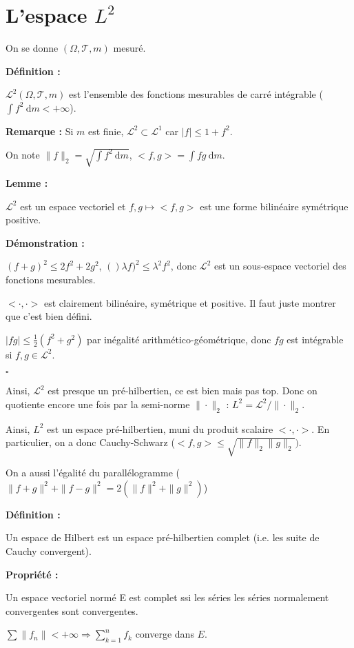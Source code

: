 \documentclass[10pt,a4paper,notitlepage ]{report}
\newcommand{\T}{\mathcal T}
\newcommand{\dd}{\ \mathrm d}
\newcommand{\1}{\mathds 1}
\newcommand{\LL}{\mathcal L}
\newenvironment{definition}[1][]{
	
	\textbf{Définition #1 : }
}
{}
\newcounter{th}
\newenvironment{propriete}[1][]{
	\begin{tcolorbox}
		\textbf{Propriété #1 : }
}
{\end{tcolorbox}}
\newenvironment{demo}[1][]{

	\textbf{Démonstration #1 :}
}{\begin{flushright}
	$\square$
\end{flushright}
}
\newenvironment{lemme}[1][]{
	\begin{tcolorbox}
		\textbf{Lemme #1 : }
	}
	{\end{tcolorbox}}
\newenvironment{rem}{
	
		\textbf{Remarque :}}{}
\begin{document}
\section{L'espace $L^2$}

On se donne $(\Omega,\T, m)$ mesuré.

\begin{definition}
	$\LL^2(\Omega,\T,m)$ est l'ensemble des fonctions mesurables de carré intégrable ($\int f^2 \dd m < +\infty$).
\end{definition}

\begin{rem}
	Si $m$ est finie, $\LL^2 \subset \LL^1$ car $|f|\le 1+f^2$.
\end{rem}

On note $\|f\|_2 = \sqrt{\int f^2 \dd m}$, $<f,g> = \int fg \dd m$.

\begin{lemme}
	$\LL^2$ est un espace vectoriel et $f,g\mapsto <f,g>$ est une forme bilinéaire symétrique positive.
\end{lemme}
\begin{demo}
	$(f+g)^2 \le 2f^2 + 2g^2$, $()\lambda f)^2 \le \lambda^2 f^2$, donc $\LL^2$ est un sous-espace vectoriel des fonctions mesurables.
	
	$<\cdot, \cdot>$ est clairement bilinéaire, symétrique et positive. Il faut juste montrer que c'est bien défini.
	
	$|fg| \le \frac 1 2 (f^2 + g^2)$ par inégalité arithmético-géométrique, donc $fg$ est intégrable si $f,g\in\LL^2$.
\end{demo}
Ainsi, $\LL^2$ est presque un pré-hilbertien, ce est bien mais pas top. Donc on quotiente encore une fois par la semi-norme $\|\cdot\|_2$ : $L^2 = \LL^2/\|\cdot\|_2$.

Ainsi, $L^2$ est un espace pré-hilbertien, muni du produit scalaire $<\cdot,\cdot>$. En particulier, on a donc Cauchy-Schwarz ($<f,g> \le \sqrt{\|f\|_2\|g\|_2})$.

On a aussi l'égalité du parallélogramme ($\|f+g\|^2 +\|f-g\|^2 = 2(\|f\|^2 + \|g\|^2)$)

\begin{definition}
	Un espace de Hilbert est un espace pré-hilbertien complet (i.e. les suite de Cauchy convergent).
\end{definition}

\begin{propriete}
	Un espace vectoriel normé E est complet ssi les séries les séries normalement convergentes sont convergentes.
	
	$\sum\|f_n\| < +\infty \Rightarrow \sum_{k=1}^n f_k$ converge dans $E$.
\end{propriete}
\end{document}
